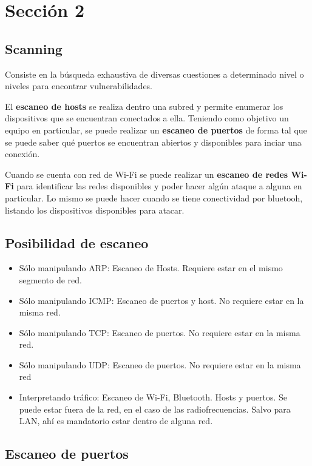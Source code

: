 \section*{Sección 2}

\subsection*{Scanning}

Consiste en la búsqueda exhaustiva de diversas cuestiones a determinado nivel o niveles para encontrar vulnerabilidades.

El \textbf{escaneo de hosts} se realiza dentro una subred y permite enumerar los dispositivos que se encuentran conectados a ella. Teniendo como objetivo un equipo en particular, se puede realizar un \textbf{escaneo de puertos} de forma tal que se puede saber qué puertos se encuentran abiertos y disponibles para inciar una conexión.

Cuando se cuenta con red de Wi-Fi se puede realizar un \textbf{escaneo de redes Wi-Fi} para identificar las redes disponibles y poder hacer algún ataque a alguna en particular. Lo mismo se puede hacer cuando se tiene conectividad por bluetooh, listando los dispositivos disponibles para atacar.


\subsection*{Posibilidad de escaneo}

\begin{itemize}
    \item Sólo manipulando ARP: Escaneo de Hosts. Requiere estar en el mismo segmento de red.
    \item Sólo manipulando ICMP: Escaneo de puertos y host. No requiere estar en la misma red.
    \item Sólo manipulando TCP: Escaneo de puertos. No requiere estar en la misma red.
    \item Sólo manipulando UDP: Escaneo de puertos. No requiere estar en la misma red
    \item Interpretando tráfico: Escaneo de Wi-Fi, Bluetooth. Hosts y puertos. Se puede estar fuera de la red, en el caso de las radiofrecuencias. Salvo para LAN, ahí es mandatorio estar dentro de alguna red. 
\end{itemize}

\subsection*{Escaneo de puertos}

